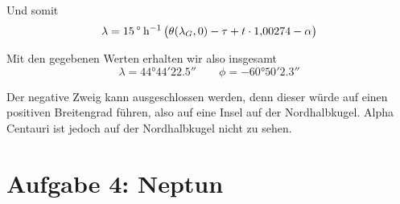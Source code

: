 \documentclass[a4paper,german,12pt,smallheadings]{scrartcl}
\begin{document}
Und somit
\begin{equation}
  \lambda = \SI{15}{\degree\per\hour} \del{\theta(\lambda_G, 0) - \tau + t \cdot 1{,}00274 - \alpha}
\end{equation}

Mit den gegebenen Werten erhalten wir also insgesamt
\begin{equation}
  \lambda = \ang{44;44;22.5} \qquad \phi = \ang{-60;50;2.3}
\end{equation}

Der negative Zweig kann ausgeschlossen werden, denn dieser würde auf einen
positiven Breitengrad führen, also auf eine Insel auf der Nordhalbkugel. Alpha
Centauri ist jedoch auf der Nordhalbkugel nicht zu sehen.

\section*{Aufgabe 4: Neptun}
\end{document}
